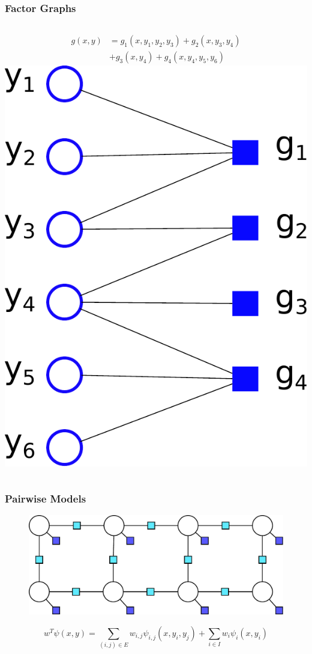 \documentclass[final,ignorenonframetext,compress]{beamer}
\begin{document}
\begin{frame}
    \frametitle{Factor Graphs}
    \begin{columns}[c]
        \begin{align*}
        g(x, y) &= g_1(x, y_1, y_2, y_3) + g_2(x, y_3, y_4)\\
                &+ g_3(x, y_4) + g_4(x, y_4, y_5, y_6)
        \end{align*}
            \includegraphics[width=\textwidth]{images/factor_graph_white_bg}
    \end{columns}
\end{frame}

\begin{frame}
    \frametitle{Pairwise Models}
    \begin{centering}
        \begin{figure}
            \includegraphics[width=.7\linewidth]{images/pairwise_factorgraph2}
        \end{figure}
    \end{centering}
    \vspace{5mm}
    \[w^T \psi(x, y) = \sum_{(i, j) \in E} w_{i,j} \psi_{i,j}(x, y_i, y_j) + \sum_{i\in I} w_i \psi_i(x, y_i)\]
\end{frame}
\end{document}
